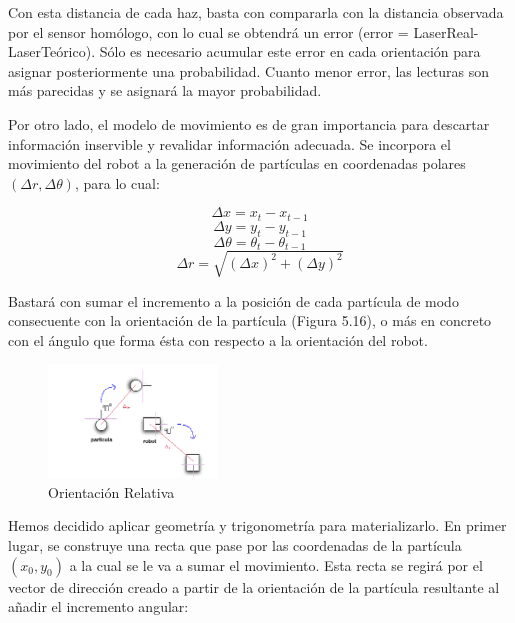 Con esta distancia de cada haz, basta con compararla con la distancia observada por el sensor homólogo, con lo cual se obtendrá un error (error = LaserReal- LaserTeórico). Sólo es necesario acumular este error en cada orientación para asignar posteriormente una probabilidad. Cuanto menor error, las lecturas son más parecidas y se asignará la mayor probabilidad.

Por otro lado, el modelo de movimiento es de gran importancia para descartar información inservible y revalidar información adecuada. Se incorpora el movimiento del robot a la generación de partículas en coordenadas polares $(\Delta r, \Delta\theta)$, para lo cual: 

\begin{equation}
\Delta x = x_{t} - x_{t-1}
\end{equation}
\begin{equation}
\Delta y = y_{t} - y_{t-1}
\end{equation}
\begin{equation}
\Delta\theta = \theta_{t} - \theta_{t-1}
\end{equation}
\begin{equation}
\Delta r = \sqrt{(\Delta x)^2+(\Delta y)^2}
\end{equation}

Bastará con sumar el incremento a la posición de cada partícula de modo consecuente con la orientación de la partícula (Figura 5.16), o más en concreto con el ángulo que forma ésta con respecto a la orientación del robot.

\begin{figure}[H]
\begin{center}
	\includegraphics[width=0.4\textwidth]{figures/orientacionrelativa.png}
	\caption{Orientación Relativa}
	\label{fig.orientacionrelativa}
	\end{center}
\end{figure}

Hemos decidido aplicar geometría y trigonometría para materializarlo. En primer lugar, se construye una recta que pase por las coordenadas de la partícula $(x_{0},y_{0})$ a la cual se le va a sumar el movimiento. Esta recta se regirá por el vector de dirección creado a partir de la orientación de la partícula resultante al añadir el incremento angular:

